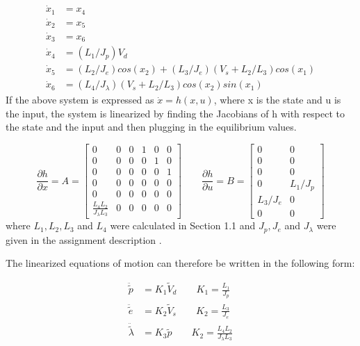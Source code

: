 \begin{subequations}
  \begin{align}
    \dot{x}_1 &= x_4 \\
    \dot{x}_2 &= x_5 \\
    \dot{x}_3 &= x_6 \\
    \dot{x}_4 &= (L_1/J_p) V_d \\
    \dot{x}_5 &= (L_2/J_e)cos(x_2) + (L_3/J_e)(V_s + L_2 / L_3)cos(x_1) \\
    \dot{x}_6 &= (L_4 / J_\lambda) (V_s + L_2 / L_3)cos(x_2)sin(x_1)
  \end{align}
\end{subequations}
If the above system is expressed as $\dot{x} = h(x, u)$, where x is
the state and u is the input, the system is linearized by finding the
Jacobians of h with respect to the state and the input and then
plugging in the equilibrium values.

\begin{equation}
\label{eq:Linearized Jacobians}
  \frac{\partial h}{\partial x} = A =
  \begin{bmatrix}
    0 & 0 & 0 & 1 & 0 & 0 \\
    0 & 0 & 0 & 0 & 1 & 0 \\
    0 & 0 & 0 & 0 & 0 & 1 \\
    0 & 0 & 0 & 0 & 0 & 0 \\
    0 & 0 & 0 & 0 & 0 & 0 \\
    \frac{L_4L_2}{J_\lambda L_3} & 0 & 0 & 0 & 0 & 0
  \end{bmatrix}
  \qquad
  \frac{\partial h}{\partial u} = B =
  \begin{bmatrix}
    0 & 0 \\
    0 & 0 \\
    0 & 0 \\
    0 & L_1/J_p \\
    L_3/J_e & 0 \\
    0 & 0
  \end{bmatrix}
\end{equation}
where $L_1, L_2, L_3$ and $L_4$ were calculated in Section 1.1 and $J_p, J_e$ and $J_\lambda$ were given in the assignment description \cite[p.14]{assignment}.

The linearized equations of motion can therefore be written in the
following form:

\begin{subequations}
\label{eq:linearized EoM}
  \begin{align}
    \ddot{\tilde{p}} &= K_1\tilde{V}_d \qquad K_1 = \frac{L_1}{J_p} \label{eq:linearized pitch EoM}\\
    \ddot{\tilde{e}} &= K_2\tilde{V}_s \qquad K_2 = \frac{L_3}{J_e} \label{eq:linearized elevation EoM}\\
    \ddot{\tilde{\lambda}} &= K_3\tilde{p} \qquad K_2 = \frac{L_4L_2}{J_\lambda L_3} \label{eq:linearized travel EoM}
  \end{align}
\end{subequations}
